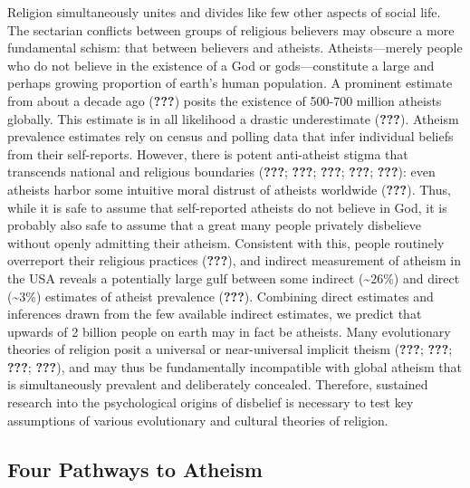 \documentclass[english,man,mask]{article}
\begin{document}
Religion simultaneously unites and divides like few other aspects of social life. The sectarian conflicts between groups of religious believers may obscure a more fundamental schism: that between believers and atheists. Atheists---merely people who do not believe in the existence of a God or gods---constitute a large and perhaps growing proportion of earth's human population. A prominent estimate from about a decade ago ({\textbf{???}}) posits the existence of 500-700 million atheists globally. This estimate is in all likelihood a drastic underestimate ({\textbf{???}}). Atheism prevalence estimates rely on census and polling data that infer individual beliefs from their self-reports. However, there is potent anti-atheist stigma that transcends national and religious boundaries ({\textbf{???}}; {\textbf{???}}; {\textbf{???}}; {\textbf{???}}; {\textbf{???}}): even atheists harbor some intuitive moral distrust of atheists worldwide ({\textbf{???}}). Thus, while it is safe to assume that self-reported atheists do not believe in God, it is probably also safe to assume that a great many people privately disbelieve without openly admitting their atheism. Consistent with this, people routinely overreport their religious practices ({\textbf{???}}), and indirect measurement of atheism in the USA reveals a potentially large gulf between some indirect (\textasciitilde{}26\%) and direct (\textasciitilde{}3\%) estimates of atheist prevalence ({\textbf{???}}). Combining direct estimates and inferences drawn from the few available indirect estimates, we predict that upwards of 2 billion people on earth may in fact be atheists. Many evolutionary theories of religion posit a universal or near-universal implicit theism ({\textbf{???}}; {\textbf{???}}; {\textbf{???}}; {\textbf{???}}), and may thus be fundamentally incompatible with global atheism that is simultaneously prevalent and deliberately concealed. Therefore, sustained research into the psychological origins of disbelief is necessary to test key assumptions of various evolutionary and cultural theories of religion.

\hypertarget{four-pathways-to-atheism}{%
\subsection{Four Pathways to Atheism}\label{four-pathways-to-atheism}}
\end{document}
